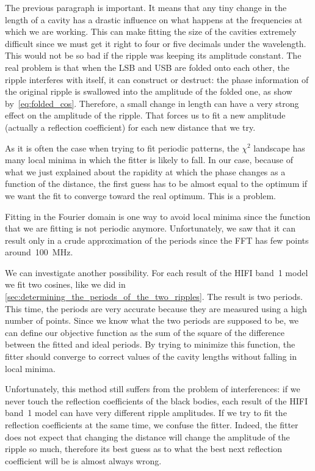 The previous paragraph is important.
It means that any tiny change in the length of a cavity has a drastic influence on what happens at the frequencies at which we are working.
This can make fitting the size of the cavities extremely difficult since we must get it right to four or five decimals under the wavelength.
This would not be so bad if the ripple was keeping its amplitude constant.
The real problem is that when the LSB and USB are folded onto each other, the ripple interferes with itself, it can construct or destruct:
the phase information of the original ripple is swallowed into the amplitude of the folded one, as show by~\cref{eq:folded_cos}.
Therefore, a small change in length can have a very strong effect on the amplitude of the ripple.
That forces us to fit a new amplitude (actually a reflection coefficient) for each new distance that we try.

As it is often the case when trying to fit periodic patterns, the $\chi^2$ landscape has many local minima in which the fitter is likely to fall.
In our case, because of what we just explained about the rapidity at which the phase changes as a function of the distance, the first guess has to be almost equal to the optimum if we want the fit to converge toward the real optimum.
This is a problem.

Fitting in the Fourier domain is one way to avoid local minima since the function that we are fitting is not periodic anymore.
Unfortunately, we saw that it can result only in a crude approximation of the periods since the FFT has few points around~\SI{100}{\mega\hertz}.

We can investigate another possibility.
For each result of the HIFI band~1 model we fit two cosines, like we did in~%
\cref{sec:determining_the_periods_of_the_two_ripples}.
The result is two periods.
This time, the periods are very accurate because they are measured using a high number of points.
Since we know what the two periods are supposed to be, we can define our objective function as the sum of the square of the difference between the fitted and ideal periods.
By trying to minimize this function, the fitter should converge to correct values of the cavity lengths without falling in local minima.

Unfortunately, this method still suffers from the problem of interferences:
if we never touch the reflection coefficients of the black bodies, each result of the HIFI band~1 model can have very different ripple amplitudes.
If we try to fit the reflection coefficients at the same time, we confuse the fitter.
Indeed, the fitter does not expect that changing the distance will change the amplitude of the ripple so much, therefore its best guess as to what the best next reflection coefficient will be is almost always wrong.

